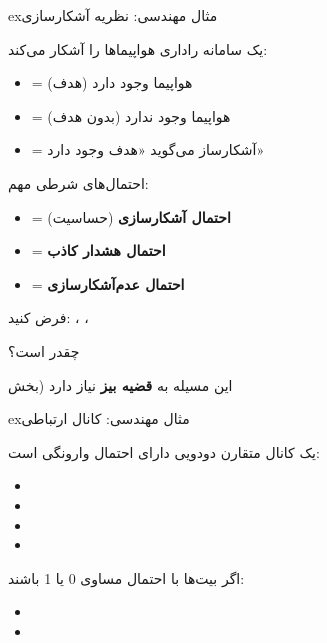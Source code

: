 \begin{PSbox}[unbreakable]{ex}{مثال مهندسی: نظریه آشکارسازی}

یک سامانه راداری هواپیماها را آشکار می‌کند:

\begin{itemize}
\tightlist
\item
   = هواپیما وجود دارد (هدف)
\item
   = هواپیما وجود ندارد (بدون هدف)
\item
   = آشکارساز می‌گوید «هدف وجود دارد»
\end{itemize}

احتمال‌های شرطی مهم:

\begin{itemize}
\tightlist
\item
   = \textbf{احتمال آشکارسازی} (حساسیت)
\item
   = \textbf{احتمال هشدار کاذب}
\item
   = \textbf{احتمال عدم‌آشکارسازی} 
\end{itemize}

فرض کنید: ، ، 

 چقدر است؟

این مسیله به \textbf{قضیه بیز} نیاز دارد (بخش 

\end{PSbox}

\begin{PSbox}[unbreakable]{ex}{مثال مهندسی: کانال ارتباطی}

یک کانال متقارن دودویی دارای احتمال وارونگی  است:

\begin{itemize}
\tightlist
\item
\item
\item
\item
\end{itemize}

اگر بیت‌ها با احتمال مساوی 0 یا 1 باشند:

\begin{itemize}
\tightlist
\item
\item
\end{itemize}

\end{PSbox}

